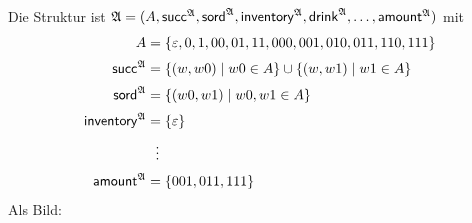 \documentclass[fontsize=11pt, twoside=false, numbers=autoenddot]{scrbook}
\begin{document}
Die Struktur ist $\mathfrak{A} = (A, \textsf{succ}^\mathfrak{A}, \textsf{sord}^\mathfrak{A}, \textsf{inventory}^\mathfrak{A}, \textsf{drink}^\mathfrak{A}, \dots, \textsf{amount}^\mathfrak{A})$ mit
%
\begin{align*}
  A                       & = \{\varepsilon,0,1,00,01,11,000,001,010,011,110,111\}   \\[2pt]
  \textsf{succ}^\mathfrak{A}      & = \{(w,w0) \mid w0 \in A\} \cup \{(w,w1) \mid w1 \in A\} \\[2pt]
  \textsf{sord}^\mathfrak{A}      & = \{(w0,w1) \mid w0,w1 \in A\}                           \\[2pt]
  \textsf{inventory}^\mathfrak{A} & = \{\varepsilon\}                                        \\[2pt]
                          & ~\,\vdots                                                \\[2pt]
  \textsf{amount}^\mathfrak{A}     & = \{001,011,111\}
\end{align*}
%
Als Bild:
\end{document}
